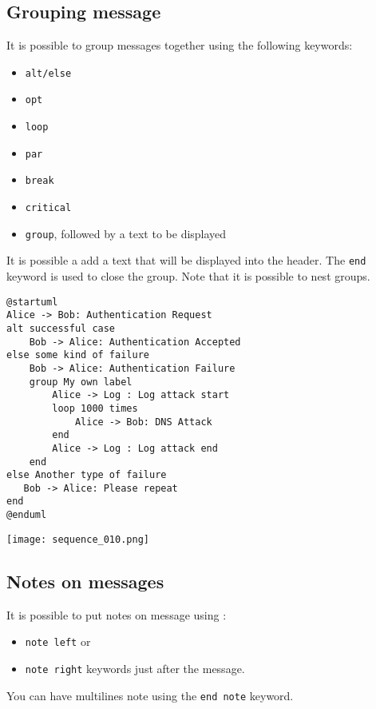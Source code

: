 		
\newpage \subsection{Grouping message}

It is possible to group messages together using the following keywords:

\begin{itemize}
  \item \texttt{alt/else}
  \item \texttt{opt}
  \item \texttt{loop}
  \item \texttt{par}
  \item \texttt{break}
  \item \texttt{critical}
  \item \texttt{group}, followed by a text to be displayed
\end{itemize}

It is possible a add a text that will be displayed into the header. The
\texttt{end} keyword is used to close the group. Note that it is possible to
nest groups.

\begin{lstlisting}
@startuml
Alice -> Bob: Authentication Request
alt successful case
    Bob -> Alice: Authentication Accepted
else some kind of failure
    Bob -> Alice: Authentication Failure
    group My own label
    	Alice -> Log : Log attack start
        loop 1000 times
            Alice -> Bob: DNS Attack
        end
    	Alice -> Log : Log attack end
    end
else Another type of failure
   Bob -> Alice: Please repeat
end
@enduml
\end{lstlisting}
\begin{center}
\texttt{[image: sequence\_010.png]}
\end{center}

\newpage \subsection{Notes on messages}

It is possible to put notes on message using :
\begin{itemize}
\item \texttt{note left} or
\item \texttt{note right} keywords just after the message.
\end{itemize}
You can have multilines note using the \texttt{end note} keyword.

